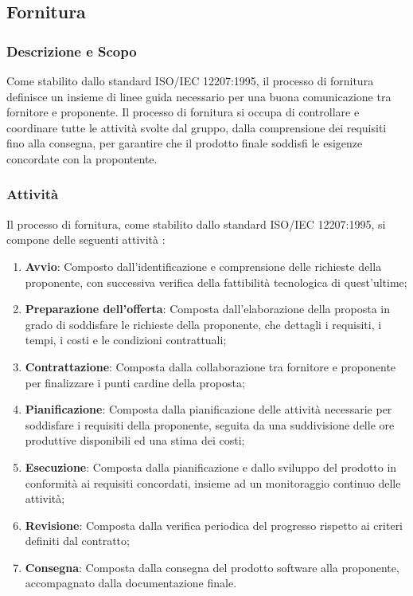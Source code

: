 \subsection{Fornitura}

\subsubsection{Descrizione e Scopo}
Come stabilito dallo standard ISO/IEC 12207:1995, il processo di fornitura definisce un insieme di linee guida necessario per una buona comunicazione tra fornitore e proponente. Il processo di fornitura si occupa di controllare e coordinare tutte le attività svolte dal gruppo, dalla comprensione dei requisiti fino alla consegna, per garantire che il prodotto finale soddisfi le esigenze concordate con la propontente.\\

\subsubsection{Attività}
Il processo di fornitura, come stabilito dallo standard ISO/IEC 12207:1995, si compone delle seguenti attività :
\begin{enumerate}
    \item \textbf{Avvio}: Composto dall'identificazione e comprensione delle richieste della proponente, con successiva verifica della fattibilità tecnologica di quest'ultime;
    \item \textbf{Preparazione dell'offerta}: Composta dall'elaborazione della proposta in grado di soddisfare le richieste della proponente, che dettagli i requisiti, i tempi, i costi e le condizioni contrattuali;
    \item \textbf{Contrattazione}: Composta dalla collaborazione tra fornitore e proponente per finalizzare i punti cardine della proposta;
    \item \textbf{Pianificazione}: Composta dalla pianificazione delle attività necessarie per soddisfare i requisiti della proponente, seguita da una suddivisione delle ore produttive disponibili ed una stima dei costi;
    \item \textbf{Esecuzione}: Composta dalla pianificazione e dallo sviluppo del prodotto in conformità ai requisiti concordati, insieme ad un monitoraggio continuo delle attività;
    \item \textbf{Revisione}: Composta dalla verifica periodica del progresso rispetto ai criteri definiti dal contratto;
    \item \textbf{Consegna}: Composta dalla consegna del prodotto software alla proponente, accompagnato dalla documentazione finale.
\end{enumerate}

